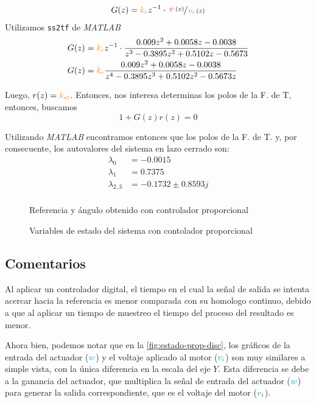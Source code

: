 \begin{align}
  G(z) &= \nara{k_{c}}z^{-1} \cdot \sfrac{\rojo{\psi}(z)}{\verd{v_{i}}(z)} \\
\end{align}
Utilizamos \verb|ss2tf| de \textit{MATLAB} 
\begin{align}
  G(z) &= \nara{k_{c}}z^{-1} \cdot \frac{0.009z^{2} + 0.0058z - 0.0038}{z^{3} - 0.3895z^{2} + 0.5102z - 0.5673} \\
  G(z) &= \nara{k_{c}}\frac{0.009z^{2} + 0.0058z - 0.0038}{z^{4} - 0.3895z^{3} + 0.5102z^{2} - 0.5673z}
\end{align}

Luego, $r(z) = \nara{k_{st}}$. Entonces, nos interesa determinas los polos de
la F. de T, entonces, buscamos
\begin{equation}
  1 + G(z)r(z) = 0
\end{equation}

Utilizando \textit{MATLAB} encontramos entonces que los polos de la F. de T. y,
por consecuente, los autovalores del sistema en lazo cerrado son:
\begin{align}
  \lambda_{0} &= -0.0015 \\
  \lambda_{1} &= 0.7375 \\
  \lambda_{2,3} &= -0.1732 \pm 0.8593j \\
\end{align}

\begin{figure}[h]
  \centering
  
  \caption{Referencia y ángulo obtenido con controlador proporcional}\label{fig:psi-prop-disc}
\end{figure}

\begin{figure}[h]
  \centering
  
  \caption{Variables de estado del sistema con contolador proporcional}\label{fig:estado-prop-disc}
\end{figure}


\FloatBarrier


\subsection{Comentarios}

Al aplicar un controlador digital, el tiempo en el cual la señal de salida se intenta acercar 
hacia la referencia es menor comparada con su homologo continuo, debido a que al aplicar 
un tiempo de muestreo el tiempo del proceso del resultado es menor. 

Ahora bien, podemos notar que en la \autoref{fig:estado-prop-disc}, los 
gráficos de la entrada del actuador ($\mathbin{\color{cyan}w}$) y el voltaje aplicado al motor 
($\verd{v_i}$) son muy similares a simple vista, con la única diferencia en la 
escala del eje $Y$. Esta diferencia se debe a la ganancia del actuador, que 
multiplica la señal de entrada del actuador ($\mathbin{\color{cyan}w}$) para generar la salida 
correspondiente, que es el voltaje del motor ($\verd{v_i}$).
